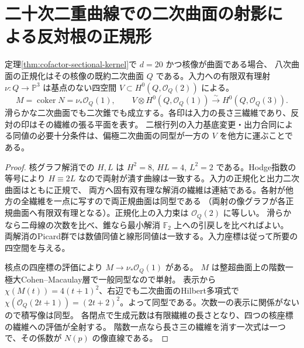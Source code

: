 \section{二十次二重曲線での二次曲面の射影による反対根の正規形}
\label{sec:quadric-kernel-projection}
\begin{theorem}\label{thm:quadric-kernel-projection}
定理\ref{thm:cofactor-sectional-kernel}で $d=20$ かつ核像が曲面である場合、
八次曲面の正規化はその核像の既約二次曲面 $Q$ である。入力への有限双有理射
$\nu:Q\to\mathbb P^3$ は基点のない四空間 $V\subset H^0(Q,\mathcal O_Q(2))$ による。
\[
 M=\operatorname{coker}N=\nu_*\mathcal O_Q(1),\qquad
 V\otimes H^0(Q,\mathcal O_Q(1))\xrightarrow{\ \sim\ } H^0(Q,\mathcal O_Q(3)).
\]
滑らかな二次曲面でも二次錐でも成立する。各印は入力の長さ三繊維であり、反対の印はその繊維の張る平面を表す。
二根行列の入力基底変更・出力合同による同値の必要十分条件は、偏極二次曲面の同型が一方の $V$ を他方に運ぶことである。
\end{theorem}
\begin{proof}
核グラフ解消での $H,L$ は $H^2=8$, $HL=4$, $L^2=2$ である。Hodge指数の等号により
$H\equiv2L$ なので両射が潰す曲線は一致する。入力の正規化と出力二次曲面はともに正規で、
両方へ固有双有理な解消の繊維は連結である。各射が他方の全繊維を一点に写すので両正規曲面は同型である
（両射の像グラフが各正規曲面へ有限双有理となる）。正規化上の入力束は $\mathcal O_Q(2)$ に等しい。
滑らかなら二母線の次数を比べ、錐なら最小解消 $\mathbb F_2$ 上への引戻しを比べればよい。
両解消のPicard群では数値同値と線形同値は一致する。入力座標は従って所要の四空間を与える。

核点の四座標の評価により $M\to\nu_*\mathcal O_Q(1)$ がある。
$M$ は整超曲面上の階数一極大Cohen--Macaulay層で一般同型なので単射。
表示から $\chi(M(t))=4(t+1)^2$、右辺でも二次曲面のHilbert多項式で
$\chi(\mathcal O_Q(2t+1))=(2t+2)^2$。よって同型である。次数一の表示に関係がないので積写像は同型。
各閉点で生成元数は有限繊維の長さとなり、四つの核座標の繊維への評価が全射する。
階数一点なら長さ三の繊維を消す一次式は一つで、その係数が $N(p)$ の像直線である。
\end{proof}

